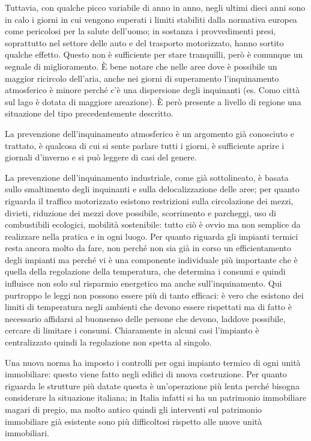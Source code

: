 \documentclass[]{article}
\begin{document}
Tuttavia, con qualche picco variabile di anno in anno, negli ultimi
dieci anni sono in calo i giorni in cui vengono superati i limiti
stabiliti dalla normativa europea come pericolosi per la salute
dell'uomo; in sostanza i provvedimenti presi, soprattutto nel settore
delle auto e del trasporto motorizzato, hanno sortito qualche effetto.
Questo non è sufficiente per stare tranquilli, però è comunque un
segnale di miglioramento. È bene notare che nelle aree dove è possibile
un maggior ricircolo dell'aria, anche nei giorni di superamento
l'inquinamento atmosferico è minore perché c'è una dispersione degli
inquinanti (es. Como città sul lago è dotata di maggiore areazione). È
però presente a livello di regione una situazione del tipo
precedentemente descritto.

La prevenzione dell'inquinamento atmosferico è un argomento già
conosciuto e trattato, è qualcosa di cui si sente parlare tutti i
giorni, è sufficiente aprire i giornali d'inverno e si può leggere di
casi del genere.

La prevenzione dell'inquinamento industriale, come già sottolineato, è
basata sullo smaltimento degli inquinanti e sulla delocalizzazione delle
aree; per quanto riguarda il traffico motorizzato esistono restrizioni
sulla circolazione dei mezzi, divieti, riduzione dei mezzi dove
possibile, scorrimento e parcheggi, uso di combustibili ecologici,
mobilità sostenibile: tutto ciò è ovvio ma non semplice da realizzare
nella pratica e in ogni luogo. Per quanto riguarda gli impianti termici
resta ancora molto da fare, non perché non sia già in corso un
efficientamento degli impianti ma perché vi è una componente individuale
più importante che è quella della regolazione della temperatura, che
determina i consumi e quindi influisce non solo sul risparmio energetico
ma anche sull'inquinamento. Qui purtroppo le leggi non possono essere
più di tanto efficaci: è vero che esistono dei limiti di temperatura
negli ambienti che devono essere rispettati ma di fatto è necessario
affidarsi al buonsenso delle persone che devono, laddove possibile,
cercare di limitare i consumi. Chiaramente in alcuni casi l'impianto è
centralizzato quindi la regolazione non spetta al singolo.

Una nuova norma ha imposto i controlli per ogni impianto termico di ogni
unità immobiliare: questo viene fatto negli edifici di nuova
costruzione. Per quanto riguarda le strutture più datate questa è
un'operazione più lenta perché bisogna considerare la situazione
italiana; in Italia infatti si ha un patrimonio immobiliare magari di
pregio, ma molto antico quindi gli interventi sul patrimonio immobiliare
già esistente sono più difficoltosi rispetto alle nuove unità
immobiliari.
\end{document}
